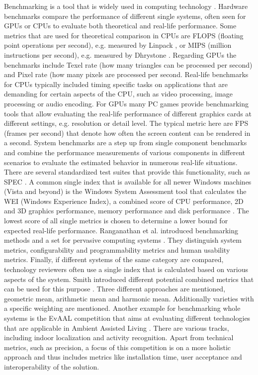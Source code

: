 Benchmarking is a tool that is widely used in computing technology \cite{lewis1985evolution}. Hardware benchmarks compare the performance of different single systems, often seen for GPUs or CPUs to evaluate both theoretical and real-life performance. Some metrics that are used for theoretical comparison in CPUs are FLOPS (floating point operations per second), e.g. measured by Linpack \cite{dongarra2003linpack}, or MIPS (million instructions per second), e.g. measured by Dhrystone \cite{weicker1984dhrystone}. Regarding GPUs the benchmarks include Texel rate (how many triangles can be processed per second) and Pixel rate (how many pixels are processed per second. Real-life benchmarks for CPUs typically included timing specific tasks on applications that are demanding for certain aspects of the CPU, such as video processing, image processing or audio encoding. For GPUs many PC games provide benchmarking tools that allow evaluating the real-life performance of different graphics cards at different settings, e.g. resolution or detail level. The typical metric here are FPS (frames per second) that denote how often the screen content can be rendered in a second.
System benchmarks are a step up from single component benchmarks and combine the performance measurements of various components in different scenarios to evaluate the estimated behavior in numerous real-life situations. There are several standardized test suites that provide this functionality, such as SPEC \cite{henning2000spec}. A common single index that is available for all newer Windows machines (Vista and beyond) is the Windows System Assessment tool that calculates the WEI (Windows Experience Index), a combined score of CPU performance, 2D and 3D graphics performance, memory performance and disk performance \cite{microsoftWEI}. The lowest score of all single metrics is chosen to determine a lower bound for expected real-life performance. Ranganathan et al. introduced benchmarking methods and a set for pervasive computing systems \cite{ranganathan2005towards}. They distinguish system metrics, configurability and programmability metrics and human usability metrics.
Finally, if different systems of the same category are compared, technology reviewers often use a single index that is calculated based on various aspects of the system. Smith introduced different potential combined metrics that can be used for this purpose \cite{smith1988characterizing}. Three different approaches are mentioned, geometric mean, arithmetic mean and harmonic mean. Additionally varieties with a specific weighting are mentioned. Another example for benchmarking whole systems is the EvAAL competition that aims at evaluating different technologies that are applicable in Ambient Assisted Living \cite{chessa_eval}. There are various tracks, including indoor localization and activity recognition. Apart from technical metrics, such as precision, a focus of this competition is on a more holistic approach and thus includes metrics like installation time, user acceptance and interoperability of the solution. 
